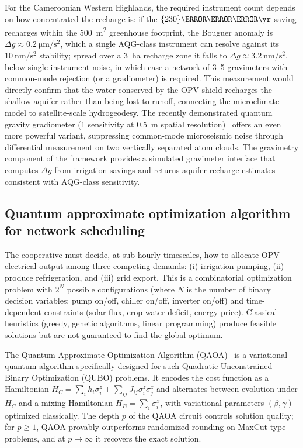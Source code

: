 \documentclass[11pt,a4paper]{article}
\begin{document}
For the Cameroonian Western Highlands, the required instrument count depends on how concentrated the recharge is: if the $\qty{230}{\m\cubed\per\yr}$ saving recharges within the \qty{500}{\m\squared} greenhouse footprint, the Bouguer anomaly is $\Delta g \approx \qty{0.2}{\micro\m\per\s\squared}$, which a single AQG-class instrument can resolve against its $\qty{10}{\nm\per\s\squared}$ stability; spread over a \qty{3}{\hectare} recharge zone it falls to $\Delta g \approx \qty{3.2}{\nm\per\s\squared}$, below single-instrument noise, in which case a network of 3--5 gravimeters with common-mode rejection (or a gradiometer) is required. This measurement would directly confirm that the water conserved by the OPV shield recharges the shallow aquifer rather than being lost to runoff, connecting the microclimate model to satellite-scale hydrogeodesy. The recently demonstrated quantum gravity gradiometer (\qty{1}{} sensitivity at \qty{0.5}{\m} spatial resolution)~\cite{Stray2022} offers an even more powerful variant, suppressing common-mode microseismic noise through differential measurement on two vertically separated atom clouds. The gravimetry component of the framework provides a simulated gravimeter interface that computes $\Delta g$ from irrigation savings and returns aquifer recharge estimates consistent with AQG-class sensitivity.

\subsection{Quantum approximate optimization algorithm for network scheduling}
\label{SI-sec:qaoa}

The cooperative must decide, at sub-hourly timescales, how to allocate OPV electrical output among three competing demands: (i) irrigation pumping, (ii) produce refrigeration, and (iii) grid export. This is a combinatorial optimization problem with $2^N$ possible configurations (where $N$ is the number of binary decision variables: pump on/off, chiller on/off, inverter on/off) and time-dependent constraints (solar flux, crop water deficit, energy price). Classical heuristics (greedy, genetic algorithms, linear programming) produce feasible solutions but are not guaranteed to find the global optimum.

The Quantum Approximate Optimization Algorithm (QAOA)~\cite{Farhi2014} is a variational quantum algorithm specifically designed for such Quadratic Unconstrained Binary Optimization (QUBO) problems. It encodes the cost function as a Hamiltonian $H_C = \sum_i h_i \sigma_i^z + \sum_{ij} J_{ij} \sigma_i^z \sigma_j^z$ and alternates between evolution under $H_C$ and a mixing Hamiltonian $H_B = \sum_i \sigma_i^x$, with variational parameters $(\beta, \gamma)$ optimized classically. The depth $p$ of the QAOA circuit controls solution quality; for $p \geq 1$, QAOA provably outperforms randomized rounding on MaxCut-type problems, and at $p \to \infty$ it recovers the exact solution.
\end{document}
